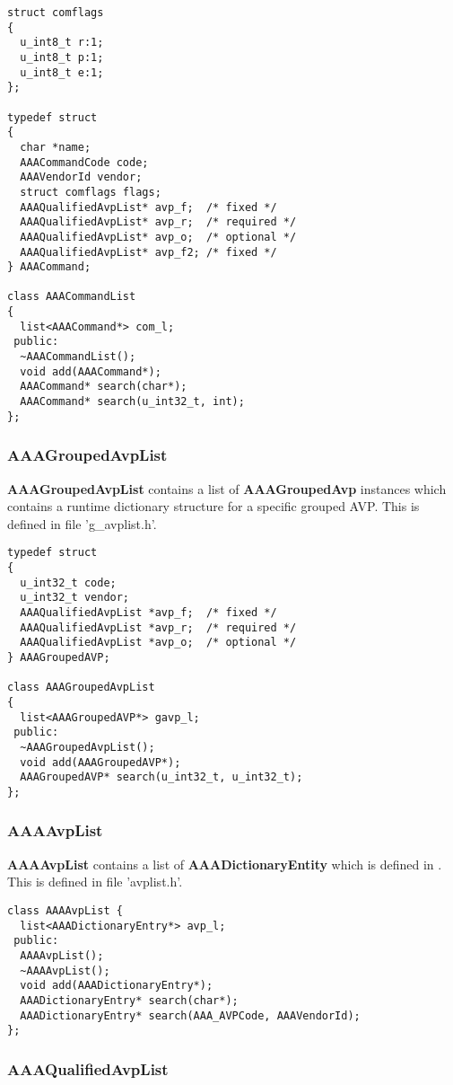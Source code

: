 \begin{verbatim}
struct comflags
{
  u_int8_t r:1;
  u_int8_t p:1;
  u_int8_t e:1;
};

typedef struct
{
  char *name;
  AAACommandCode code;
  AAAVendorId vendor;
  struct comflags flags;
  AAAQualifiedAvpList* avp_f;  /* fixed */
  AAAQualifiedAvpList* avp_r;  /* required */
  AAAQualifiedAvpList* avp_o;  /* optional */
  AAAQualifiedAvpList* avp_f2; /* fixed */
} AAACommand;

class AAACommandList
{
  list<AAACommand*> com_l;
 public:
  ~AAACommandList();
  void add(AAACommand*);
  AAACommand* search(char*);
  AAACommand* search(u_int32_t, int);
};
\end{verbatim}

\subsubsection{AAAGroupedAvpList}

{\bf AAAGroupedAvpList} contains a list of {\bf AAAGroupedAvp}
instances which contains a runtime dictionary structure for a 
specific grouped AVP.  This is defined in file 'g\_avplist.h'.

\begin{verbatim}
typedef struct
{
  u_int32_t code;
  u_int32_t vendor;
  AAAQualifiedAvpList *avp_f;  /* fixed */
  AAAQualifiedAvpList *avp_r;  /* required */
  AAAQualifiedAvpList *avp_o;  /* optional */
} AAAGroupedAVP;

class AAAGroupedAvpList
{
  list<AAAGroupedAVP*> gavp_l;
 public:
  ~AAAGroupedAvpList();
  void add(AAAGroupedAVP*);
  AAAGroupedAVP* search(u_int32_t, u_int32_t);
};
\end{verbatim}

\subsubsection{AAAAvpList}

{\bf AAAAvpList} contains a list of {\bf AAADictionaryEntity} which 
is defined in \cite{api-draft}.  This is defined in file 'avplist.h'.

\begin{verbatim}
class AAAAvpList {
  list<AAADictionaryEntry*> avp_l;
 public:
  AAAAvpList();
  ~AAAAvpList();
  void add(AAADictionaryEntry*);
  AAADictionaryEntry* search(char*);
  AAADictionaryEntry* search(AAA_AVPCode, AAAVendorId);
};
\end{verbatim}

\subsubsection{AAAQualifiedAvpList}

